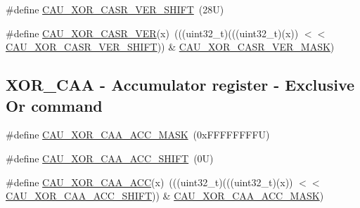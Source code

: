 \begin{DoxyCompactItemize}
\#define \mbox{\hyperlink{group___c_a_u___register___masks_ga935619a005c89a213ef4df90046e2802}{C\+A\+U\+\_\+\+X\+O\+R\+\_\+\+C\+A\+S\+R\+\_\+\+V\+E\+R\+\_\+\+S\+H\+I\+FT}}~(28\+U)
\item 
\#define \mbox{\hyperlink{group___c_a_u___register___masks_gad0d12a99e05798ea2c6cd22d02b0752a}{C\+A\+U\+\_\+\+X\+O\+R\+\_\+\+C\+A\+S\+R\+\_\+\+V\+ER}}(x)~(((uint32\+\_\+t)(((uint32\+\_\+t)(x)) $<$$<$ \mbox{\hyperlink{group___c_a_u___register___masks_ga935619a005c89a213ef4df90046e2802}{C\+A\+U\+\_\+\+X\+O\+R\+\_\+\+C\+A\+S\+R\+\_\+\+V\+E\+R\+\_\+\+S\+H\+I\+FT}})) \& \mbox{\hyperlink{group___c_a_u___register___masks_ga1ac156673986e2dc85b9d9491a3d4bf2}{C\+A\+U\+\_\+\+X\+O\+R\+\_\+\+C\+A\+S\+R\+\_\+\+V\+E\+R\+\_\+\+M\+A\+SK}})
\end{DoxyCompactItemize}
\subsection*{X\+O\+R\+\_\+\+C\+AA -\/ Accumulator register -\/ Exclusive Or command}
\begin{DoxyCompactItemize}
\item 
\#define \mbox{\hyperlink{group___c_a_u___register___masks_gad749b4e76ae58d704efbe7be8c9fd935}{C\+A\+U\+\_\+\+X\+O\+R\+\_\+\+C\+A\+A\+\_\+\+A\+C\+C\+\_\+\+M\+A\+SK}}~(0x\+F\+F\+F\+F\+F\+F\+F\+F\+U)
\item 
\#define \mbox{\hyperlink{group___c_a_u___register___masks_gabce35c8c48d54d7175820c3a5f0b120c}{C\+A\+U\+\_\+\+X\+O\+R\+\_\+\+C\+A\+A\+\_\+\+A\+C\+C\+\_\+\+S\+H\+I\+FT}}~(0\+U)
\item 
\#define \mbox{\hyperlink{group___c_a_u___register___masks_gadef3a35dce2667f2a097ceed047bd414}{C\+A\+U\+\_\+\+X\+O\+R\+\_\+\+C\+A\+A\+\_\+\+A\+CC}}(x)~(((uint32\+\_\+t)(((uint32\+\_\+t)(x)) $<$$<$ \mbox{\hyperlink{group___c_a_u___register___masks_gabce35c8c48d54d7175820c3a5f0b120c}{C\+A\+U\+\_\+\+X\+O\+R\+\_\+\+C\+A\+A\+\_\+\+A\+C\+C\+\_\+\+S\+H\+I\+FT}})) \& \mbox{\hyperlink{group___c_a_u___register___masks_gad749b4e76ae58d704efbe7be8c9fd935}{C\+A\+U\+\_\+\+X\+O\+R\+\_\+\+C\+A\+A\+\_\+\+A\+C\+C\+\_\+\+M\+A\+SK}})
\end{DoxyCompactItemize}
